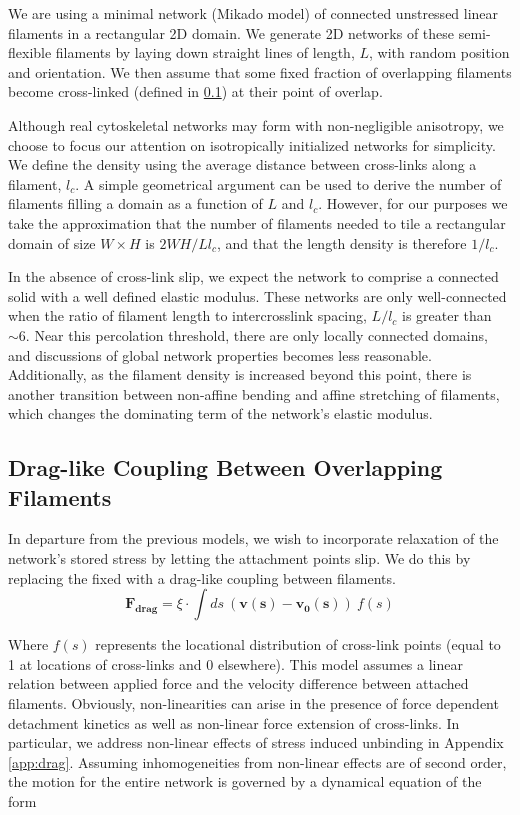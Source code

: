 \documentclass[pre,reprint]{revtex4-1}
\begin{document}
We are using a minimal network (Mikado model) of connected unstressed linear filaments in a rectangular 2D domain.  We generate 2D networks of these semi-flexible filaments by laying down straight lines of length, $L$, with random position and orientation. We then assume that some fixed fraction of overlapping filaments become cross-linked (defined in \ref{exp_drag}) at their point of overlap.

Although real cytoskeletal networks may form with non-negligible anisotropy, we choose to focus our attention on isotropically initialized networks for simplicity.  We define the density using the average distance between cross-links along a filament, $l_c$. A simple geometrical argument can be used to derive the number of filaments filling a domain as a function of $L$ and $l_c$\cite{theo_hlm}.  However, for our purposes we take the approximation that the number of filaments needed to tile a rectangular domain of size $W \times H$  is $2WH/Ll_c$, and that the length density is therefore $1/l_c$. 

In the absence of cross-link slip, we expect the network to comprise a connected solid with a well defined elastic modulus\cite{theo_hlm,theo_hlm2}.  These networks are only well-connected when the ratio of filament length to intercrosslink spacing, $L/l_c$ is greater than $\sim 6$.  Near this percolation threshold, there are only locally connected domains, and discussions of global network properties becomes less reasonable.  Additionally, as the filament density is increased beyond this point, there is another transition between non-affine bending and affine stretching of filaments, which changes the dominating term of the network's elastic modulus.



\subsection{Drag-like Coupling Between Overlapping Filaments}
\label{exp_drag}
In departure from the previous models, we wish to incorporate relaxation of the network's stored stress by letting the attachment points slip.  We do this by replacing the fixed with a drag-like coupling between filaments.
\begin{equation}
\mathbf{F_{drag}} = \xi \cdot \int ds \: (\mathbf{v(s)}-\mathbf{v_0(s)}) \: f(s)
\end{equation}

Where $f(s)$ represents the locational distribution of cross-link points (equal to 1 at locations of cross-links and 0 elsewhere).  This model assumes a linear relation between applied force and the velocity difference between attached filaments.  Obviously, non-linearities can arise in the presence of force dependent detachment kinetics as well as non-linear force extension of cross-links.  In particular, we address non-linear effects of stress induced unbinding in Appendix \ref{app:drag}.  Assuming inhomogeneities from non-linear effects are of second order, the motion for the entire network is governed by a dynamical equation of the form
\end{document}
